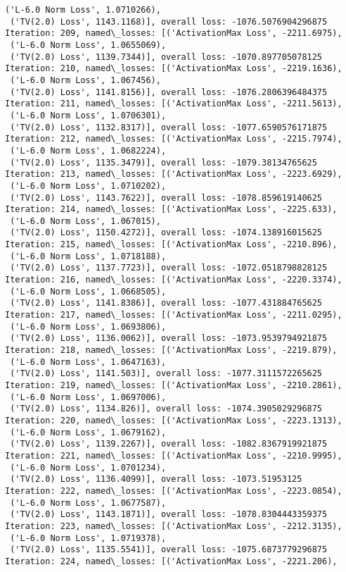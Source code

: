 \documentclass[10pt]{article}
\begin{document}
\begin{Verbatim}[commandchars=\\\{\}]
 ('L-6.0 Norm Loss', 1.0710266),
 ('TV(2.0) Loss', 1143.1168)], overall loss: -1076.5076904296875
Iteration: 209, named\_losses: [('ActivationMax Loss', -2211.6975),
 ('L-6.0 Norm Loss', 1.0655069),
 ('TV(2.0) Loss', 1139.7344)], overall loss: -1070.897705078125
Iteration: 210, named\_losses: [('ActivationMax Loss', -2219.1636),
 ('L-6.0 Norm Loss', 1.067456),
 ('TV(2.0) Loss', 1141.8156)], overall loss: -1076.2806396484375
Iteration: 211, named\_losses: [('ActivationMax Loss', -2211.5613),
 ('L-6.0 Norm Loss', 1.0706301),
 ('TV(2.0) Loss', 1132.8317)], overall loss: -1077.6590576171875
Iteration: 212, named\_losses: [('ActivationMax Loss', -2215.7974),
 ('L-6.0 Norm Loss', 1.0682224),
 ('TV(2.0) Loss', 1135.3479)], overall loss: -1079.38134765625
Iteration: 213, named\_losses: [('ActivationMax Loss', -2223.6929),
 ('L-6.0 Norm Loss', 1.0710202),
 ('TV(2.0) Loss', 1143.7622)], overall loss: -1078.859619140625
Iteration: 214, named\_losses: [('ActivationMax Loss', -2225.633),
 ('L-6.0 Norm Loss', 1.067015),
 ('TV(2.0) Loss', 1150.4272)], overall loss: -1074.138916015625
Iteration: 215, named\_losses: [('ActivationMax Loss', -2210.896),
 ('L-6.0 Norm Loss', 1.0718188),
 ('TV(2.0) Loss', 1137.7723)], overall loss: -1072.0518798828125
Iteration: 216, named\_losses: [('ActivationMax Loss', -2220.3374),
 ('L-6.0 Norm Loss', 1.0668505),
 ('TV(2.0) Loss', 1141.8386)], overall loss: -1077.431884765625
Iteration: 217, named\_losses: [('ActivationMax Loss', -2211.0295),
 ('L-6.0 Norm Loss', 1.0693806),
 ('TV(2.0) Loss', 1136.0062)], overall loss: -1073.9539794921875
Iteration: 218, named\_losses: [('ActivationMax Loss', -2219.879),
 ('L-6.0 Norm Loss', 1.0647163),
 ('TV(2.0) Loss', 1141.503)], overall loss: -1077.3111572265625
Iteration: 219, named\_losses: [('ActivationMax Loss', -2210.2861),
 ('L-6.0 Norm Loss', 1.0697006),
 ('TV(2.0) Loss', 1134.826)], overall loss: -1074.3905029296875
Iteration: 220, named\_losses: [('ActivationMax Loss', -2223.1313),
 ('L-6.0 Norm Loss', 1.0679162),
 ('TV(2.0) Loss', 1139.2267)], overall loss: -1082.8367919921875
Iteration: 221, named\_losses: [('ActivationMax Loss', -2210.9995),
 ('L-6.0 Norm Loss', 1.0701234),
 ('TV(2.0) Loss', 1136.4099)], overall loss: -1073.51953125
Iteration: 222, named\_losses: [('ActivationMax Loss', -2223.0854),
 ('L-6.0 Norm Loss', 1.0677587),
 ('TV(2.0) Loss', 1143.1871)], overall loss: -1078.8304443359375
Iteration: 223, named\_losses: [('ActivationMax Loss', -2212.3135),
 ('L-6.0 Norm Loss', 1.0719378),
 ('TV(2.0) Loss', 1135.5541)], overall loss: -1075.6873779296875
Iteration: 224, named\_losses: [('ActivationMax Loss', -2221.206),

\end{Verbatim}
\end{document}
